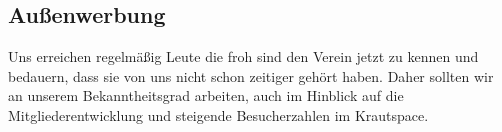 \documentclass[ngerman,10pt,DIV16]{scrartcl}
\begin{document}
\subsection{Außenwerbung}
Uns erreichen regelmäßig Leute die froh sind den Verein jetzt zu kennen und bedauern, dass sie von uns nicht schon zeitiger gehört haben.
Daher sollten wir an unserem Bekanntheitsgrad arbeiten, auch im Hinblick auf die Mitgliederentwicklung und steigende Besucherzahlen im Krautspace.
\end{document}
